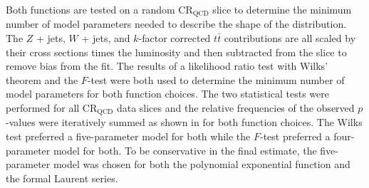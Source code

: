 Both functions are tested on a random $\text{CR}_{\text{QCD}}$ slice to
determine the minimum number of model parameters needed to describe the shape
of the distribution.  The $Z$ + jets, $W$ + jets, and $k$-factor corrected
$t\bar{t}$ contributions are all scaled by their cross sections times the
luminosity and then subtracted from the slice to remove bias from the fit.  The
results of a likelihood ratio test with Wilks' theorem \cite{wilks1938} and the
$F$-test \cite{snecdecor1991statistical} were both used to determine the
minimum number of model parameters for both function choices.  The two
statistical tests were performed for all $\text{CR}_{\text{QCD}}$ data slices
and the relative frequencies of the observed $p$-values were iteratively summed
as shown in  for both function choices.
The Wilks test preferred a five-parameter model for both while the $F$-test
preferred a four-parameter model for both.  To be conservative in the final
estimate, the five-parameter model was chosen for both the polynomial
exponential function and the formal Laurent series.

